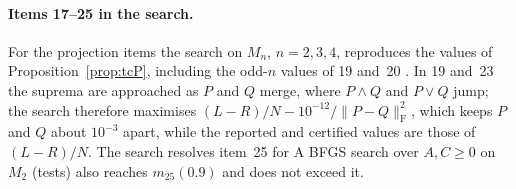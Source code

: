 \paragraph{Items 17--25 in the search.} For the projection items the search on $M_n$, $n=2,3,4$, reproduces the values
of Proposition~\ref{prop:tcP}, including the odd-$n$ values of 19 and~20
. In 19 and~23 the suprema are approached as $P$ and $Q$ merge, where $P\wedge Q$ and $P\vee Q$ jump;
the search therefore maximises $(L-R)/N-10^{-12}/\|P-Q\|_{\mathrm F}^2$, which keeps $P$ and $Q$ about $10^{-3}$ apart,
while the reported and certified values are those of $(L-R)/N$. The search resolves item~25 for
 A BFGS search over $A,C\ge0$ on $M_2$ (tests) also reaches $m_{25}(0.9)$ and does not
exceed it.
